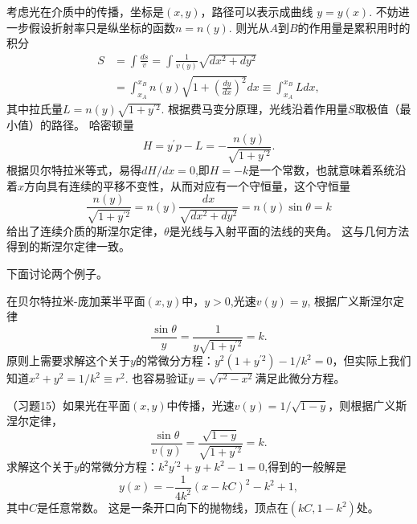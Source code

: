 \documentclass{article}
\begin{document}
考虑光在介质中的传播，坐标是$(x, y)$，路径可以表示成曲线 $y=y(x)$.
不妨进一步假设折射率只是纵坐标的函数$n=n(y)$.
则光从$A$到$B$的作用量是累积用时的积分
\begin{equation}
\begin{aligned}
S
&=\int\frac{ds}{v}
=\int\frac{1}{v(y)}\sqrt{dx^{2}+dy^{2}} \\
&=\int_{x_{A}}^{x_{B}}n(y)\sqrt{1+\left(\frac{dy}{dx}\right)^{2}}dx
\equiv\int_{x_{A}}^{x_{B}}Ldx,
\end{aligned}
\end{equation}
其中拉氏量$L=n(y)\sqrt{1+y^{\prime{2}}}$.
根据费马变分原理，光线沿着作用量$S$取极值（最小值）的路径。
哈密顿量
\begin{equation}
    H
    =y^{\prime}p-L
    =-\frac{n(y)}{\sqrt{1+y^{\prime{2}}}}.
\end{equation}
根据贝尔特拉米等式，易得$dH/dx=0$,即$H=-k$是一个常数，也就意味着系统沿着$x$方向具有连续的平移不变性，从而对应有一个守恒量，这个守恒量
\begin{equation}
    \frac{n(y)}{\sqrt{1+y^{\prime{2}}}}
    =n(y)\frac{dx}{\sqrt{dx^{2}+dy^{2}}}
    =n(y)\sin\theta=k
\end{equation}
给出了连续介质的斯涅尔定律，$\theta$是光线与入射平面的法线的夹角。
这与几何方法得到的斯涅尔定律一致。

下面讨论两个例子。

在贝尔特拉米-庞加莱半平面$(x, y)$中，$y>0$,光速$v(y)=y$,
根据广义斯涅尔定律
\begin{equation*}
    \frac{\sin\theta}{y}
    =\frac{1}{y\sqrt{1+y^{\prime{2}}}}=k.
\end{equation*}
原则上需要求解这个关于$y$的常微分方程：$y^{2}(1+y^{\prime{2}})-1/k^{2}=0$，但实际上我们知道$x^{2}+y^{2}=1/k^{2}\equiv{r^{2}}$.
也容易验证$y=\sqrt{r^{2}-x^{2}}$满足此微分方程。

（习题15）如果光在平面$(x, y)$中传播，光速$v(y)=1/\sqrt{1-y}$，则根据广义斯涅尔定律，
\begin{equation*}
    \frac{\sin\theta}{v(y)}
    =\frac{\sqrt{1-y}}{\sqrt{1+y^{\prime{2}}}}=k.
\end{equation*}
求解这个关于$y$的常微分方程：$k^{2}y^{\prime{2}}+y+k^{2}-1=0$,得到的一般解是
\begin{equation*}
    y(x)
    =-\frac{1}{4k^{2}}\left(x-kC\right)^{2}-k^{2}+1,
\end{equation*}
其中$C$是任意常数。
这是一条开口向下的抛物线，顶点在$\left(kC, 1-k^{2}\right)$处。

%
%
\end{document}
